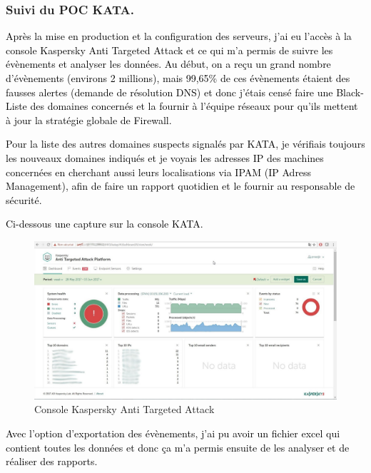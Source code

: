 \subsubsection{Suivi du POC KATA. }
\textcolor{black}{Après la mise en production et la configuration des serveurs, j’ai eu l’accès à la console Kaspersky Anti Targeted Attack et ce qui m’a permis de suivre les évènements et analyser les données. }
\textcolor{black}{Au début, on a reçu un grand nombre d'évènements (environs 2 millions), mais 99,65\% de ces évènements étaient des fausses alertes (demande de résolution DNS) et donc j’étais censé faire une Black-Liste des domaines concernés et la fournir à l’équipe réseaux pour qu’ils mettent à jour la stratégie globale de Firewall.}

\textcolor{black}{Pour la liste des autres domaines suspects signalés par KATA, je vérifiais toujours les nouveaux domaines indiqués et je voyais les adresses IP des machines concernées en cherchant aussi leurs localisations via IPAM (IP Adress Management), afin de faire un rapport quotidien et le fournir au responsable de sécurité. }

\textcolor{black}{Ci-dessous une capture sur la console KATA.}

\begin{figure}[H]
	\begin{center}
		\includegraphics[width=1\linewidth]{Projet_KATA/console_kata}
\end{center}
	\caption{Console Kaspersky Anti Targeted Attack}
	\label{fig:9}	
\end{figure}		 
		 

\textcolor{black}{Avec l’option d’exportation des évènements, j’ai pu avoir un fichier excel qui contient toutes les données et donc ça m'a permis ensuite de les analyser et de réaliser des rapports.}


